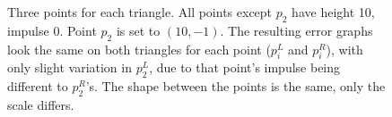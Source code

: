\begin{figure}[h!t]
  \caption{Three points for each triangle. All points except $p_2$ have height 10, impulse 0. Point $p_2$ is set to $(10,-1)$. The resulting error graphs look the same on both triangles for each point ($p_i^L$ and $p_i^R$), with only slight variation in $p_2^L$, due to that point's impulse being different to $p_2^R$'s. The shape between the points is the same, only the scale differs.}
  \label{fig:three-points-u2-}
\end{figure}

